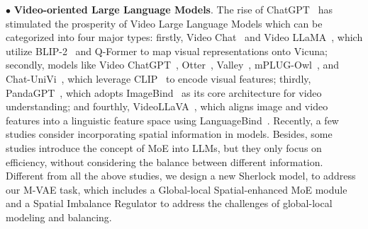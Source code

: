 $\bullet$ \textbf{Video-oriented Large Language Models}. The rise of ChatGPT~\cite{chatgpt} has stimulated the prosperity of Video Large Language Models which can be categorized into four major types: firstly, Video Chat~\cite{videochat} and Video LLaMA~\cite{video-llama}, which utilize BLIP-2~\cite{blip2} and Q-Former to map visual representations onto Vicuna; secondly, models like Video ChatGPT~\cite{video-chatgpt}, Otter~\cite{otter}, Valley~\cite{valley}, mPLUG-Owl~\cite{mPLUG}, and Chat-UniVi~\cite{chatunivi}, which leverage CLIP~\cite{clip} to encode visual features; thirdly, PandaGPT~\cite{pandagpt}, which adopts ImageBind~\cite{imagebind} as its core architecture for video understanding; and fourthly, VideoLLaVA~\cite{video-llava}, which aligns image and video features into a linguistic feature space using LanguageBind~\cite{languagebind}. Recently, a few studies \cite{scene1,scene2} consider incorporating spatial information in models. Besides, some studies \cite{nestedmoe,onellm,onellm2} introduce the concept of MoE into LLMs, but they only focus on efficiency, without considering the balance between different information. Different from all the above studies, we design a new Sherlock model, to address our M-VAE task, which includes a Global-local Spatial-enhanced MoE module and a Spatial
Imbalance Regulator to address the challenges of global-local modeling and balancing.


